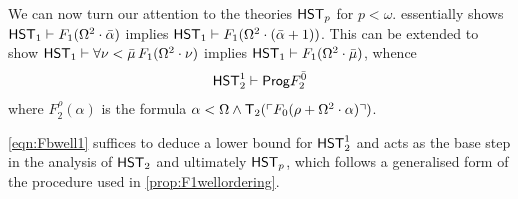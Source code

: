 \documentclass[UKenglish,cleveref,DIV=12]{scrartcl}
\theoremstyle{definition}
\theoremstyle{definition}
\begin{document}
We can now turn our attention to the theories $\mathsf{HST}_p$ for $p<\omega$.
 essentially shows $\mathsf{HST}_1\vdash
F_1(\Omega^2\cdot\bar\alpha)$ implies $\mathsf{HST}_1\vdash
F_1(\Omega^2\cdot(\bar\alpha+1))$. This can be extended to show $\mathsf{HST}_1\vdash\forall\nu<\bar\mu\,F_1(\Omega^2\cdot\nu)$ implies $\mathsf{HST}_1\vdash F_1(\Omega^2\cdot\bar\mu)$, whence
\begin{gather}\label{eqn:Fbwell1}
  \mathsf{HST}_2^1\vdash \mathsf{Prog}  F^{\bar 0}_2
\end{gather}
where $F_2^{\rho}(\alpha)$ is the formula $\alpha<\Omega\land\mathsf{T}_2(\ulcorner{F_0(\rho+\Omega^2\cdot\alpha)}\urcorner)$.

\eqref{eqn:Fbwell1} suffices to deduce a lower bound for $\mathsf{HST}_2^1$ and acts as
the base step in the analysis of $\mathsf{HST}_2$ and ultimately $\mathsf{HST}_p$, which follows a
generalised form of the procedure used in \cref{prop:F1wellordering}.
\end{document}

